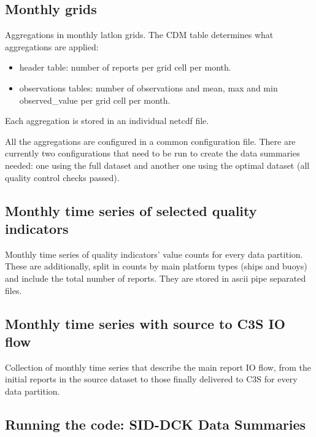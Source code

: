 \documentclass[letterpaper,10pt,english]{sphinxmanual}
\begin{document}
\subsection{Monthly grids}
\label{\detokenize{index:monthly-grids-sd-section}}\label{\detokenize{index:id3}}
Aggregations in monthly lat\sphinxhyphen{}lon grids. The CDM table determines what aggregations are applied:
\begin{itemize}
\item {} 
header table: number of reports per grid cell per month.

\item {} 
observations tables: number of observations and mean, max and min
observed\_value per grid cell per month.

\end{itemize}

Each aggregation is stored in an individual netcdf file.

All the aggregations are configured in a common configuration file. 
There are currently two configurations that need to be run to create the data summaries needed: 
one using the full dataset and another one using the optimal dataset (all quality control checks passed).


\subsection{Monthly time series of selected quality indicators}
\label{\detokenize{index:qi-counts-sd-section}}\label{\detokenize{index:id4}}
Monthly time series of quality indicators’ value counts for every  data partition. 
These are additionally, split in counts by main platform types (ships and buoys) and include the total number of reports. 
They are stored in ascii pipe separated files.


\subsection{Monthly time series with source to C3S IO flow}
\label{\detokenize{index:monthly-time-series-with-source-to-c3s-io-flow}}\label{\detokenize{index:report-io-sd-section}}
Collection of monthly time series that describe the main report IO flow, from the initial reports in the source dataset to those finally delivered to C3S for every  data partition.

\subsection{Running the code: SID-DCK Data Summaries}
\end{document}
